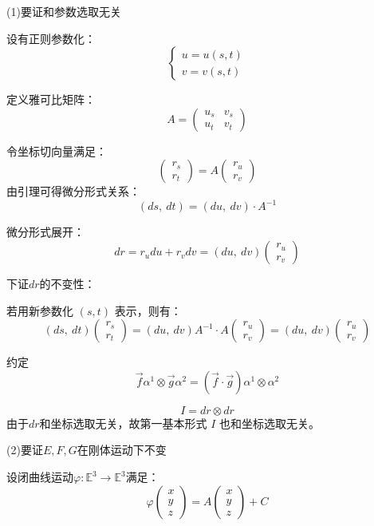 \documentclass[lang=cn,10pt,thmcnt=section]{elegantbook}
\begin{document}
(1)要证和参数选取无关

设有正则参数化：
\[
\begin{cases} 
u = u(s, t) \\ 
v = v(s, t)
\end{cases}
\]

定义雅可比矩阵：
\[
A = \begin{pmatrix}
u_s & v_s \\ 
u_t & v_t
\end{pmatrix}
\]

令坐标切向量满足：
\[
\begin{pmatrix}
r_s \\ 
r_t
\end{pmatrix} = 
A \begin{pmatrix}
r_u \\ 
r_v
\end{pmatrix}
\]
由引理可得微分形式关系：
\[
(ds,\ dt) = (du,\ dv) \cdot A^{-1}
\]

微分形式展开：
\[
dr = r _u du + r _v dv = (du,\ dv) \begin{pmatrix} r _u \\ r _v \end{pmatrix}
\]

下证$dr$的不变性：

若用新参数化 $(s,t)$ 表示，则有：
\[
(ds,\ dt) \begin{pmatrix} r _s \\ r_t \end{pmatrix} 
= (du,\ dv) A^{-1} \cdot A \begin{pmatrix} r_u \\ r_v \end{pmatrix} 
= (du,\ dv) \begin{pmatrix} r_u \\ r_v \end{pmatrix}
\]

约定
$$
\vec{f} \alpha^1\otimes \vec{g} \alpha^{2} = (\vec{f} \cdot \vec{g})\alpha^1\otimes \alpha^{2}
$$

\[
I = dr \otimes dr
\]
由于$dr$和坐标选取无关，故第一基本形式 $I$ 也和坐标选取无关。

(2)要证$E,F,G$在刚体运动下不变

设闭曲线运动\(\varphi: \mathbb{E}^3 \to \mathbb{E}^3\)满足：
\[
\varphi\begin{pmatrix}x\\ y \\ z \end{pmatrix} = A \begin{pmatrix}x\\ y \\ z \end{pmatrix} + C
\]
\end{document}
